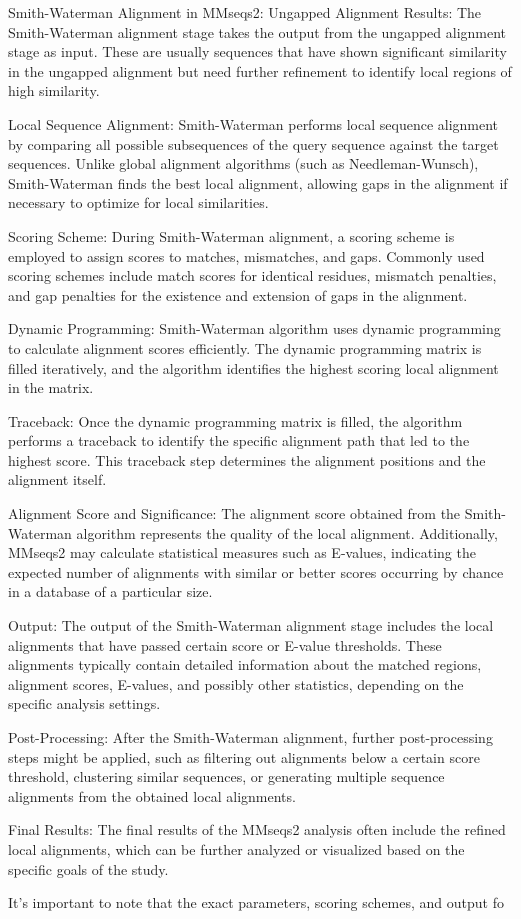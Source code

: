 Smith-Waterman Alignment in MMseqs2:
Ungapped Alignment Results:
The Smith-Waterman alignment stage takes the output from the ungapped alignment stage as input. These are usually sequences that have shown significant similarity in the ungapped alignment but need further refinement to identify local regions of high similarity.

Local Sequence Alignment:
Smith-Waterman performs local sequence alignment by comparing all possible subsequences of the query sequence against the target sequences. Unlike global alignment algorithms (such as Needleman-Wunsch), Smith-Waterman finds the best local alignment, allowing gaps in the alignment if necessary to optimize for local similarities.

Scoring Scheme:
During Smith-Waterman alignment, a scoring scheme is employed to assign scores to matches, mismatches, and gaps. Commonly used scoring schemes include match scores for identical residues, mismatch penalties, and gap penalties for the existence and extension of gaps in the alignment.

Dynamic Programming:
Smith-Waterman algorithm uses dynamic programming to calculate alignment scores efficiently. The dynamic programming matrix is filled iteratively, and the algorithm identifies the highest scoring local alignment in the matrix.

Traceback:
Once the dynamic programming matrix is filled, the algorithm performs a traceback to identify the specific alignment path that led to the highest score. This traceback step determines the alignment positions and the alignment itself.

Alignment Score and Significance:
The alignment score obtained from the Smith-Waterman algorithm represents the quality of the local alignment. Additionally, MMseqs2 may calculate statistical measures such as E-values, indicating the expected number of alignments with similar or better scores occurring by chance in a database of a particular size.

Output:
The output of the Smith-Waterman alignment stage includes the local alignments that have passed certain score or E-value thresholds. These alignments typically contain detailed information about the matched regions, alignment scores, E-values, and possibly other statistics, depending on the specific analysis settings.

Post-Processing:
After the Smith-Waterman alignment, further post-processing steps might be applied, such as filtering out alignments below a certain score threshold, clustering similar sequences, or generating multiple sequence alignments from the obtained local alignments.

Final Results:
The final results of the MMseqs2 analysis often include the refined local alignments, which can be further analyzed or visualized based on the specific goals of the study.

It's important to note that the exact parameters, scoring schemes, and output fo